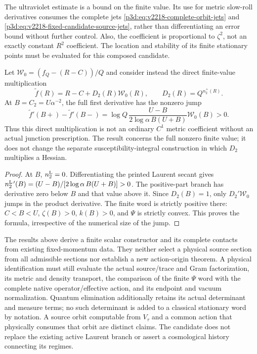 \documentclass[12pt,a4paper]{article}
\begin{document}
The ultraviolet estimate is a bound on the finite value.  Its use for
metric slow-roll derivatives consumes the complete jets
\eqref{p3d:eq:v2218-complete-orbit-jets} and
\eqref{p3d:eq:v2218-fixed-candidate-source-jets}, rather than
differentiating an error bound without further control.  Also, the
coefficient is proportional to $\zeta^2$, not an exactly constant
$R^2$ coefficient.  The location and stability of its finite
stationary points must be evaluated for this composed candidate.

\begin{proposition}
\label{p3d:prop:v2218-finite-value-junction}
Let $\mathscr W_0=(f_Q-(R-C))/Q$ and consider instead the direct
finite-value multiplication
\[
 \widetilde f(R)=R-C+D_2(R)\mathscr W_0(R),\qquad
 D_2(R)=Q^{n_2^+(R)}.
\]
At $B=C_2=U\alpha^{-2}$, the full first derivative has the nonzero jump
\begin{equation}
 \boxed{\widetilde f'(B+)-\widetilde f'(B-)
 =\log Q\,\frac{U-B}{2\log\alpha\,B(U+B)}
       \mathscr W_0(B)>0.}
 \label{p3d:eq:v2218-finite-value-junction}
\end{equation}
Thus this direct multiplication is not an ordinary $C^1$ metric
coefficient without an actual junction prescription.  The result concerns
the full nonzero finite value; it does not change the separate
susceptibility-integral construction in which $D_2$ multiplies a
Hessian.
\end{proposition}
\begin{proof}
At $B$, $n_2^{\rm L}=0$.  Differentiating the printed Laurent secant
gives
$n_2^{\rm L\,\prime}(B)=(U-B)/[2\log\alpha\,B(U+B)]>0$.
The positive-part branch has derivative zero below $B$ and that value
above it.  Since $D_2(B)=1$, only $D_2'\mathscr W_0$ jumps in
the product derivative.  The finite word is strictly positive there:
$C<B<U$, $\zeta(B)>0$, $k(B)>0$, and $\Psi$ is strictly convex.
This proves the formula, irrespective of the numerical size of the jump.
\end{proof}

\begin{remark}
\label{p3d:rem:v2218-fixed-candidate-status}
The results above derive a finite scalar constructor and its complete
contacts from existing fixed-momentum data.  They neither select a
physical source section from all admissible sections nor establish a
new action-origin theorem.  A physical identification must still
evaluate the actual source/trace and Gram factorization, its metric
and density transport, the comparison of the finite $\Psi$ word with
the complete native operator/effective action, and its endpoint and
vacuum normalization.  Quantum elimination additionally retains its
actual determinant and measure terms; no such determinant is added to
a classical stationary word by notation.  A source orbit computable
from $V_\tau$ and a common action that physically consumes that orbit
are distinct claims.  The candidate does not replace the existing
active Laurent branch or assert a cosmological history connecting its
regimes.
\end{remark}
\end{document}
